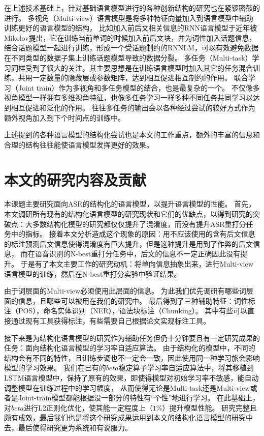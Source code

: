 在上述技术基础上，针对基础语言模型进行的各种创新结构的研究也在紧锣密鼓的进行。
多视角（Multi-view）语言模型是将多种特征向量加入到语言模型中辅助训练更好的语言模型的结构，
比如加入前后文相关信息的RNN语言模型于近年被Mikolov提出，它在训练当前单词的时候加入前后文块，并为词性加入话题信息，结合话题模型一起进行训练，形成一个受话题制约的RNNLM，可以有效避免数据在不同类型的数据子集上训练话题模型导致的数据分裂。
多任务（Multi-task）学习同样受到了很大的关注，其主要思想是在训练语言模型时加入其它的任务混合训练，共用一定数量的隐藏层或参数矩阵，达到相互促进相互制约的作用。
联合学习（Joint train）作为多视角和多任务模型的结合，也是最复杂的一个。
不仅像多视角模型一样拥有多维视角特征，也像多任务学习一样多种不同任务共同学习以达到相互促进和泛化的作用。
往往多任务的输出会以各种经过尝试的较好方式作为额外视角加入到下个时间点的训练中。

上述提到的各种语言模型的结构化尝试也是本文的工作重点，额外的丰富的信息和合理的结构往往能使语言模型发挥更好的效果。







	
\section{本文的研究内容及贡献}

本课题主要研究面向ASR的结构化的语言模型，以提升语言模型的性能。
首先，本文调研所有现有的结构化语言模型的研究现状和它们的优缺点，以得到研究的突破点：大多数结构化模型的研究都仅仅提升了混淆度，而没有提升ASR重打分任务中的指标。
接着本文分析造成这个现象的原因：用不应该使用的含有后文信息的标注预测后文信息使得混淆度有巨大提升，但是这种提升是用到了作弊的后文信息，
而在语音识别的N-best重打分任务中，后文的信息不一定正确因此没有提升。
于是有了本文主要工作的研究动机：将单向信息抽象出来，进行Multi-view语言模型的训练，然后在N-best重打分实验中验证结果。


由于词层面的Multi-view必须使用此层面的信息。
为此我们优先调研有哪些词层面的信息，且哪些可以被用在我们的研究中。
最后得到了三种辅助特征：词性标注（POS），命名实体识别（NER），语法块标注（Chunking）。
其中有些可以直接通过现有工具获得标注，有些需要自己根据论文实现标注工具。

接下来是为结构化语言模型的研究作为辅助任务但仍十分钟要且有一定研究成果的任务：面向结构化语言模型的学习率自适应算法。
由于结构化的模型中，不同的结构会有不同的特性，且训练步调也不一定会一致，因此使用同一种学习旅会影响模型的学习效果。
我们在已有的$beta$稳定算子学习率自适应算法中，将其移植到LSTM语言模型中，保持了原有的效果，即使得模型对初始学习率不敏感，能自动调整模型在训练过程中的学习幅度，
从而使得无论是Multi-task还是Multi-view或者是Joint-train模型都能根据没一部分的特性有“个性”地进行学习。
在此基础上，对$beta$进行L2正则化优化，使其能一定程度上（$1\%$）提升模型性能。
研究完整且颇有成效，最后我们也是将这个研究成果运用到本文的结构化语言模型的研究中去，最后使得研究更为系统和有说服力。

